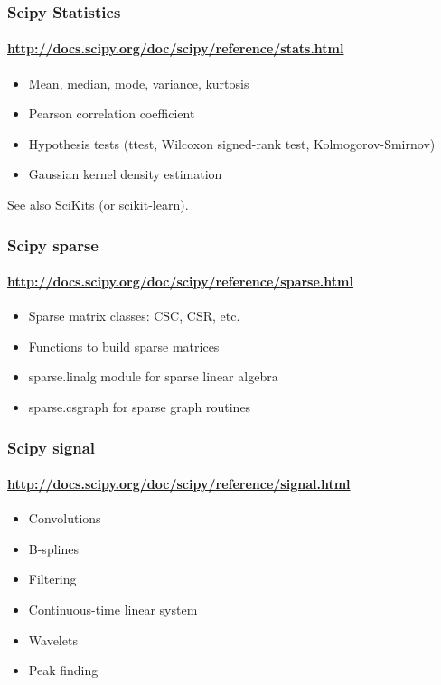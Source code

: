 \begin{frame}\frametitle{Scipy Statistics}
    \framesubtitle{\url{http://docs.scipy.org/doc/scipy/reference/stats.html}}

    \begin{itemize}
        \item Mean, median, mode, variance, kurtosis
        \item Pearson correlation coefficient
        \item Hypothesis tests (ttest, Wilcoxon signed-rank test, Kolmogorov-Smirnov)
        \item Gaussian kernel density estimation
    \end{itemize}

See also SciKits (or scikit-learn).

\end{frame}

\begin{frame}\frametitle{Scipy sparse}
    \framesubtitle{\url{http://docs.scipy.org/doc/scipy/reference/sparse.html}}

    \begin{itemize}
        \item Sparse matrix classes: CSC, CSR, etc.
        \item Functions to build sparse matrices
        \item sparse.linalg module for sparse linear algebra
        \item sparse.csgraph for sparse graph routines
    \end{itemize}

\end{frame}

\begin{frame}\frametitle{Scipy signal}
    \framesubtitle{\url{http://docs.scipy.org/doc/scipy/reference/signal.html}}

    \begin{itemize}
        \item Convolutions
        \item B-splines
        \item Filtering
        \item Continuous-time linear system
        \item Wavelets
        \item Peak finding
    \end{itemize}

\end{frame}


